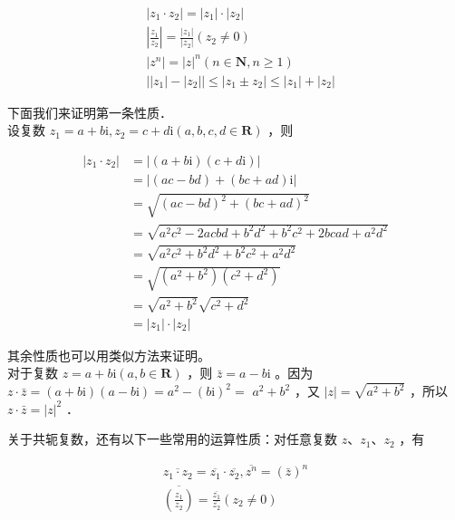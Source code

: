 \documentclass[10pt]{article}
\begin{document}
\[
\begin{aligned}
& \left|z_{1} \cdot z_{2}\right|=\left|z_{1}\right| \cdot\left|z_{2}\right| \\
& \left|\frac{z_{1}}{z_{2}}\right|=\frac{\left|z_{1}\right|}{\left|z_{2}\right|}\left(z_{2} \neq 0\right) \\
& \left|z^{n}\right|=|z|^{n}(n \in \mathbf{N}, n \geqslant 1) \\
& \left|\left|z_{1}\right|-\left|z_{2}\right|\right| \leqslant\left|z_{1} \pm z_{2}\right| \leqslant\left|z_{1}\right|+\left|z_{2}\right|
\end{aligned}
\]

下面我们来证明第一条性质．\\
设复数 \(z_{1}=a+b \mathrm{i}, z_{2}=c+d \mathrm{i}(a, b, c, d \in \mathbf{R})\) ，则

\[
\begin{aligned}
\left|z_{1} \cdot z_{2}\right| & =|(a+b \mathrm{i})(c+d \mathrm{i})| \\
& =|(a c-b d)+(b c+a d) \mathrm{i}| \\
& =\sqrt{(a c-b d)^{2}+(b c+a d)^{2}} \\
& =\sqrt{a^{2} c^{2}-2 a c b d+b^{2} d^{2}+b^{2} c^{2}+2 b c a d+a^{2} d^{2}} \\
& =\sqrt{a^{2} c^{2}+b^{2} d^{2}+b^{2} c^{2}+a^{2} d^{2}} \\
& =\sqrt{\left(a^{2}+b^{2}\right)\left(c^{2}+d^{2}\right)} \\
& =\sqrt{a^{2}+b^{2}} \sqrt{c^{2}+d^{2}} \\
& =\left|z_{1}\right| \cdot\left|z_{2}\right|
\end{aligned}
\]

其余性质也可以用类似方法来证明。\\
对于复数 \(z=a+b \mathrm{i}(a, b \in \mathbf{R})\) ，则 \(\bar{z}=a-b \mathrm{i}\) 。因为 \(z \cdot \bar{z}=(a+b \mathrm{i})(a-b \mathrm{i})=a^{2}-(b \mathrm{i})^{2}=\) \(a^{2}+b^{2}\) ，又 \(|z|=\sqrt{a^{2}+b^{2}}\) ，所以 \(z \cdot \bar{z}=|z|^{2}\) ．

关于共轭复数，还有以下一些常用的运算性质：对任意复数 \(z 、 z_{1} 、 z_{2}\) ，有

\[
\begin{gathered}
\overline{z_{1} \cdot z_{2}}=\overline{z_{1}} \cdot \overline{z_{2}}, \overline{z^{n}}=(\bar{z})^{n} \\
\overline{\left(\frac{z_{1}}{z_{2}}\right)}=\frac{\overline{z_{1}}}{\overline{z_{2}}}\left(z_{2} \neq 0\right)
\end{gathered}
\]
\end{document}
